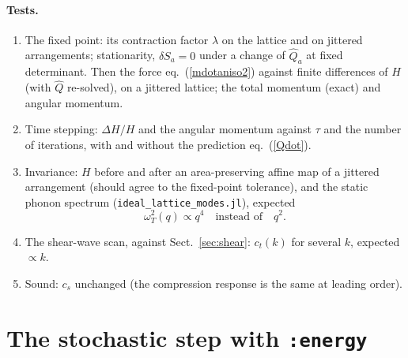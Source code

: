 \documentclass[11pt,aps,preprint,nofootinbib,superscriptaddress,tightenlines]{revtex4-2}
\def\st{\begin{equation}}
\def\stp{\end{equation}}
\def\Eq#1{eq.~(\ref{#1})}
\def\Sect#1{Sect.~\ref{#1}}
\let\oldparagraph\paragraph
\renewcommand{\paragraph}{\par\bigskip\oldparagraph}
\begin{document}
\paragraph{Tests.}
\begin{enumerate}
\item The fixed point: its contraction factor $\lambda$ on the lattice and on jittered
  arrangements; stationarity, $\delta S_a=0$ under a change of $\hat Q_a$ at fixed
  determinant.  Then the force \Eq{mdotaniso2} against finite differences of $H$ (with $\hat Q$
  re-solved), on a jittered lattice; the total momentum (exact) and angular momentum.
\item Time stepping: $\Delta H/H$ and the angular momentum against $\tau$ and the number of
  iterations, with and without the prediction \Eq{Qdot}.
\item Invariance: $H$ before and after an area-preserving affine map of a jittered
  arrangement (should agree to the fixed-point tolerance), and the static phonon spectrum
  (\texttt{ideal\_lattice\_modes.jl}), expected
  \st
  \omega_T^2(q)\propto q^4\quad\text{instead of}\quad q^2 .
  \stp
\item The shear-wave scan, against \Sect{sec:shear}: $c_t(k)$ for several $k$, expected
  $\propto k$.
\item Sound: $c_s$ unchanged (the compression response is the same at leading order).
\end{enumerate}

\section{The stochastic step with \texttt{:energy}}
\label{sec:stoch}
\end{document}
